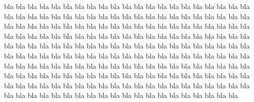 bla bla bla bla bla bla bla bla bla bla bla
bla bla bla bla bla bla bla bla bla bla bla
bla bla bla bla bla bla bla bla bla bla bla
bla bla bla bla bla bla bla bla bla bla bla
bla bla bla bla bla bla bla bla bla bla bla
bla bla bla bla bla bla bla bla bla bla bla
bla bla bla bla bla bla bla bla bla bla bla
bla bla bla bla bla bla bla bla bla bla bla
bla bla bla bla bla bla bla bla bla bla bla
bla bla bla bla bla bla bla bla bla bla bla
bla bla bla bla bla bla bla bla bla bla bla
bla bla bla bla bla bla bla bla bla bla bla
bla bla bla bla bla bla bla bla bla bla bla
bla bla bla bla bla bla bla bla bla bla bla
bla bla bla bla bla bla bla bla bla bla bla
bla bla bla bla bla bla bla bla bla bla bla
bla bla bla bla bla bla bla bla bla bla bla
bla bla bla bla bla bla bla bla bla bla bla
bla bla bla bla bla bla bla bla bla bla bla
\bye

